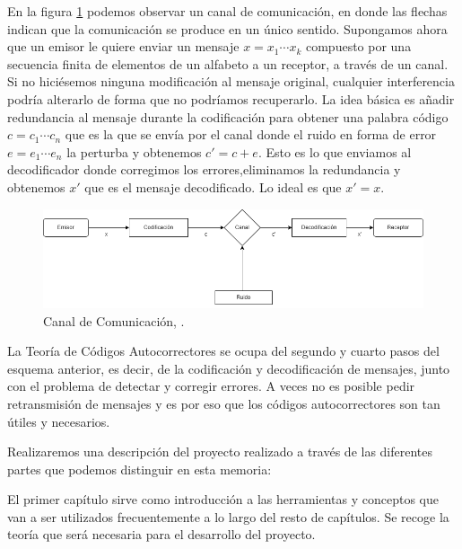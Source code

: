 En la figura \ref{fig:uno} podemos observar un canal de comunicación, en donde las flechas indican que la comunicación se produce en un único sentido. Supongamos ahora que un emisor le quiere enviar un mensaje $x = x_1 \cdots x_k$ compuesto por una secuencia finita de elementos de un alfabeto a un receptor, a través de un canal. Si no hiciésemos ninguna modificación al mensaje original, cualquier interferencia podría alterarlo de forma que no podríamos recuperarlo. La idea básica es añadir redundancia al mensaje durante la codificación para obtener una palabra código $c = c_1\cdots c_n$ que es la que se envía por el canal donde el ruido en forma de error $e=e_1 \cdots e_n$ la perturba y obtenemos $c' = c + e$. Esto es lo que enviamos al decodificador donde corregimos los errores,eliminamos la redundancia y obtenemos $x'$ que es el mensaje decodificado. Lo ideal es que $x' = x$. \cite{Huffman_Pless_2010}



\begin{figure}[H]

	\center
	\includegraphics[scale=0.5]{img/canal_comunicacion.png}
	\caption{Canal de Comunicación, \cite{Podesta_2006}.}
     \label{fig:uno}
\end{figure}


La Teoría de Códigos Autocorrectores se ocupa del segundo y cuarto pasos del esquema anterior, es decir, de la codificación y decodificación de mensajes, junto con el problema de
detectar y corregir errores. A veces no es posible pedir retransmisión de mensajes y es por eso que los códigos autocorrectores son tan útiles y necesarios. \cite{Podesta_2006}






Realizaremos una descripción del proyecto realizado a través de las diferentes partes que podemos distinguir en esta memoria:

El primer capítulo sirve como introducción a las herramientas y conceptos que van a ser utilizados frecuentemente a lo largo del resto de capítulos. Se recoge la teoría que será necesaria para el desarrollo del proyecto.

